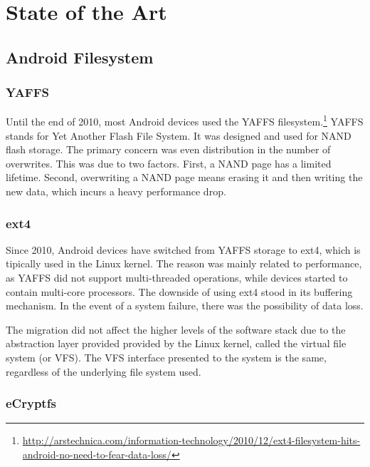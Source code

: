 \chapter{State of the Art}
\label{chapter:state}

\section{Android Filesystem}
\label{sec:android-filesys}

\subsection{YAFFS}
\label{sub-sec:yaffs}

Until the end of 2010, most Android devices used the YAFFS filesystem.\footnote{\url{http://arstechnica.com/information-technology/2010/12/ext4-filesystem-hits-android-no-need-to-fear-data-loss/}}
YAFFS stands for Yet Another Flash File System. It was designed and used for NAND flash storage. The primary concern was even distribution in the number of overwrites. This was due to two factors. First, a NAND page has a limited lifetime. Second, overwriting a NAND page means erasing it and then writing the new data, which incurs a heavy performance drop.

\subsection{ext4}
\label{sub-sec:ext4}

Since 2010, Android devices have switched from YAFFS storage to ext4, which is tipically used in the Linux kernel. The reason was mainly related to performance, as YAFFS did not support multi-threaded operations, while devices started to contain multi-core processors.
The downside of using ext4 stood in its buffering mechanism. In the event of a system failure, there was the possibility of data loss.

The migration did not affect the higher levels of the software stack due to the abstraction layer provided provided by the Linux kernel, called the virtual file system (or VFS). The VFS interface presented to the system is the same, regardless of the underlying file system used.

\subsection{eCryptfs}
\label{sub-sec:ecryptfs}

